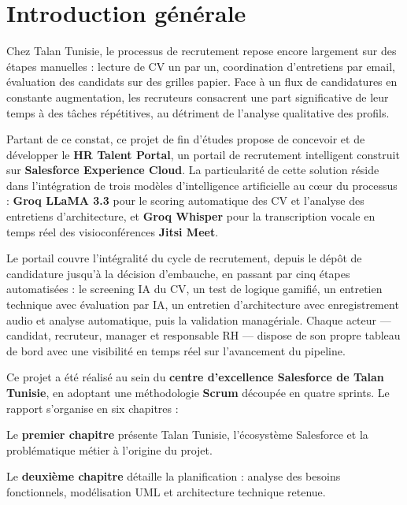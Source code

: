 \chapter*{Introduction générale}
\label{chap:introduction}

Chez Talan Tunisie, le processus de recrutement repose encore largement sur des
étapes manuelles : lecture de CV un par un, coordination d'entretiens par email,
évaluation des candidats sur des grilles papier. Face à un flux de candidatures
en constante augmentation, les recruteurs consacrent une part significative de
leur temps à des tâches répétitives, au détriment de l'analyse qualitative des
profils.

\medskip
Partant de ce constat, ce projet de fin d'études propose de concevoir et de
développer le \textbf{HR Talent Portal}, un portail de recrutement intelligent
construit sur \textbf{Salesforce Experience Cloud}. La particularité de cette
solution réside dans l'intégration de trois modèles d'intelligence artificielle
au c\oe{}ur du processus : \textbf{Groq LLaMA 3.3} pour le scoring automatique des
CV et l'analyse des entretiens d'architecture, et \textbf{Groq Whisper} pour la
transcription vocale en temps réel des visioconférences \textbf{Jitsi Meet}.

\medskip
Le portail couvre l'intégralité du cycle de recrutement, depuis le dépôt de
candidature jusqu'à la décision d'embauche, en passant par cinq étapes
automatisées : le screening IA du CV, un test de logique gamifié, un entretien
technique avec évaluation par IA, un entretien d'architecture avec
enregistrement audio et analyse automatique, puis la validation managériale.
Chaque acteur --- candidat, recruteur, manager et responsable RH --- dispose
de son propre tableau de bord avec une visibilité en temps réel sur l'avancement
du pipeline.

\medskip
Ce projet a été réalisé au sein du \textbf{centre d'excellence Salesforce de
Talan Tunisie}, en adoptant une méthodologie \textbf{Scrum} découpée en quatre
sprints. Le rapport s'organise en six chapitres :

\medskip
Le \textbf{premier chapitre} présente Talan Tunisie, l'écosystème Salesforce et
la problématique métier à l'origine du projet.

\medskip
Le \textbf{deuxième chapitre} détaille la planification : analyse des besoins
fonctionnels, modélisation UML et architecture technique retenue.

